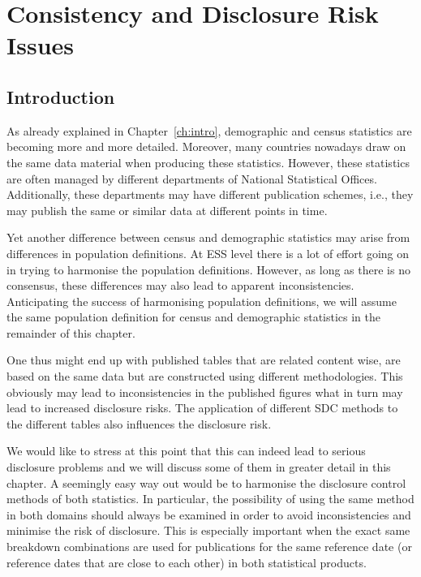 \chapter{Consistency and Disclosure Risk Issues}\label{ch:consistency}
\section{Introduction}
As already explained in Chapter~\ref{ch:intro}, demographic and census statistics are becoming more and more detailed. Moreover, many countries nowadays draw on the same data material when producing these statistics. 
However, these statistics are often managed by different departments of National Statistical Offices. Additionally, these departments may have different publication schemes, i.e., they may publish the same or similar data at different points in time. 

Yet another difference between census and demographic statistics may arise from differences in population definitions. At ESS level there is a lot of effort going on in trying to harmonise the population definitions. However, as long as there is no consensus, these differences may also lead to apparent inconsistencies. Anticipating the success of harmonising population definitions, we will assume the same population definition for census and demographic statistics in the remainder of this chapter.

One thus might end up with published tables that are related content wise, are based on the same data but are constructed using different methodologies. This obviously may lead to inconsistencies in the published figures what in turn may lead to increased disclosure risks. The application of different SDC methods to the different tables also influences the disclosure risk. 

We would like to stress at this point that this can indeed lead to serious disclosure problems and we will discuss some of them in greater detail in this chapter. A seemingly easy way out would be to harmonise the disclosure control methods of both statistics. In particular, the possibility of using the same method in both domains should always be examined in order to avoid inconsistencies and minimise the risk of disclosure. This is especially important when the exact same breakdown combinations are used for publications for the same reference date (or reference dates that are close to each other) in both statistical products.

